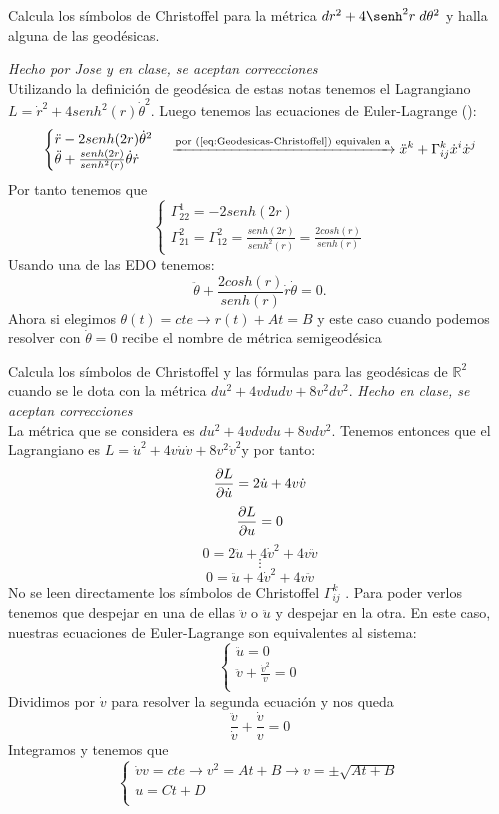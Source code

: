 \begin{problem}[12] Calcula los símbolos de Christoffel
	para la métrica $dr^2+4\senh^2r\; d\theta^2
	$ y halla alguna de 
	las geodésicas.
	
	
	\solution\textit{Hecho por Jose y en clase, se aceptan correcciones}\\ Utilizando la definición de geodésica de estas notas tenemos el Lagrangiano $L=\dot{r}^2+4senh^2(r)\dot{\theta}^2$. Luego tenemos las ecuaciones de Euler-Lagrange ():
	$$\begin{cases}\ddot{r}-2senh(2r)\dot{\theta}^2\\\ddot{\theta}+\frac{senh(2r)}{senh^2(r)}\dot{\theta}\dot{r}\\
	\end{cases}\xrightarrow{\text{por }(\refeq{eq:Geodesicas-Christoffel})\text{ equivalen a}}\ddot{x}^k+\Gamma^k_{ij}\dot{x}^i\dot{x}^j$$
	Por tanto tenemos que $$\begin{cases}
	\Gamma^1_{22}=-2senh(2r)\\\Gamma^2_{21}=\Gamma^2_{12}=\frac{senh(2r)}{senh^2(r)}=\frac{2cosh(r)}{senh(r)}
	\end{cases}$$
	Usando una de las EDO tenemos: $$\ddot{\theta}+\frac{2cosh(r)}{senh(r)}\dot{r}\dot{\theta}=0.$$Ahora si elegimos $\theta(t)=cte\longrightarrow r(t)+At=B$ y este caso cuando podemos resolver con $\dot{\theta}=0$ recibe el nombre de métrica semigeodésica
	
\end{problem}
\begin{problem}[13] Calcula los símbolos de Christoffel y las fórmulas para las geodésicas de $ℝ^2$ cuando se le dota con la
	métrica
	$
	du^2+4vdudv+8v^2dv^2.
	$
	\solution\textit{Hecho en clase, se aceptan correcciones}\\ La métrica que se considera es $du^2+4vdvdu+8vdv^2$. Tenemos entonces que el Lagrangiano es $L=\dot{u}^2+4v\dot{u}\dot{v}+8v^2\dot{v}^2$y por tanto: $$\pdv{L}{\dot{u}}=2\dot{u}+4v\dot{v}$$ $$\pdv{L}{u}=0$$ $$0=2\ddot{u}+4\dot{v}^2+4v\ddot{v}$$ $$\vdots$$ $$0=\ddot{u}+4\dot{v}^2+4v\ddot{v}$$ No se leen directamente los símbolos de Christoffel $\Gamma^k_{ij}$ . Para poder verlos tenemos que despejar en una de ellas $\ddot{v}$ o $\ddot{u}$ y despejar en la otra. En este caso, nuestras ecuaciones de Euler-Lagrange son equivalentes al sistema: $$\begin{cases}
	\ddot{u}=0\\
	\ddot{v}+\frac{\dot{v}^2}{v}=0\\
	\end{cases}$$ Dividimos por $\dot{v}$ para resolver la segunda ecuación y nos queda $$\frac{\ddot{v}}{\dot{v}}+\frac{\dot{v}}{v}=0$$ Integramos y tenemos que $$\begin{cases}
	\dot{v}v=cte\longrightarrow v^2=At+B\longrightarrow v=\pm\sqrt{At+B}\\u=Ct+D\\
	\end{cases}$$
\end{problem}
